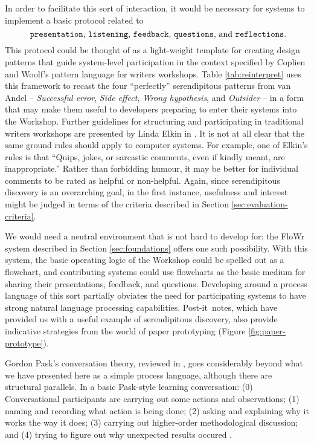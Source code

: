 In order to facilitate this sort of interaction, it would be necessary
for systems to implement a basic protocol related to
\[
\text{
{\tt presentation}, {\tt listening}, {\tt
  feedback}, {\tt questions}, and {\tt
  reflections}.}
\]
This protocol could be thought of as a light-weight template for
creating design patterns that guide system-level participation in the
context specified by Coplien and Woolf's pattern language for writers
workshops.  Table \ref{tab:reinterpret} uses this framework to recast
the four ``perfectly'' serendipitous patterns from van Andel --
\emph{Successful error}, \emph{Side effect}, \emph{Wrong hypothesis},
and \emph{Outsider} -- in a form that may make them useful to
developers preparing to enter their systems into the Workshop.
%
Further guidelines for structuring and participating in traditional
writers workshops are presented by Linda Elkin in
\cite[pp. 201-203]{gabriel2002writer}.  It is not at all clear that
the same ground rules should apply to computer systems.  For example,
one of Elkin's rules is that ``Quips, jokes, or sarcastic comments,
even if kindly meant, are inappropriate.''  Rather than forbidding
humour, it may be better for individual comments to be rated as
helpful or non-helpful.  Again, since serendipitous discovery is an
overarching goal, in the first instance, usefulness and interest might
be judged in terms of the criteria described in Section
\ref{sec:evaluation-criteria}.

We would need a neutral environment that is not hard to develop for:
the {\sf FloWr} system described in Section \ref{sec:foundations}
offers one such possibility.  With this system, the basic operating
logic of the Workshop could be spelled out as a flowchart, and
contributing systems could use flowcharts as the basic medium for
sharing their presentations, feedback, and questions.  Developing
around a process language of this sort partially obviates the need for
participating systems to have strong natural language processing
capabilities.  
%
Post-it\texttrademark\ notes, which have provided us with a useful
example of serendipitous discovery, also provide indicative strategies
from the world of paper prototyping (Figure \ref{fig:paper-prototype}).

Gordon Pask's conversation theory, reviewed in
\cite{conversation-theory-review,boyd2004conversation}, goes
considerably beyond what we have presented here as a simple process
language, although there are structural parallels.  In a basic
Pask-style learning conversation: (0) Conversational participants are
carrying out some actions and observations; (1) naming and recording
what action is being done; (2) asking and explaining why it works the
way it does; (3) carrying out higher-order methodological discussion;
and (4) trying to figure out why unexpected results occured \cite[p. 190]{boyd2004conversation}.

